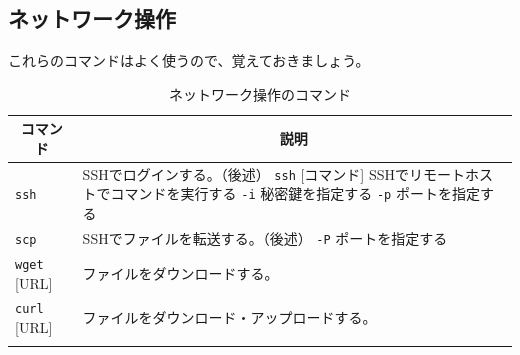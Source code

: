 \documentclass[a4j]{ltjsreport}
\begin{document}
    \subsection{ネットワーク操作}
    これらのコマンドはよく使うので、覚えておきましょう。
    \begin{longtable}[c]{|p{3.5cm}|p{13.5cm}|}
        \hline
        \multicolumn{1}{|c|}{\textbf{コマンド}}&\multicolumn{1}{|c|}{\textbf{説明}}\\
        \hline\hline
        \texttt{ssh} &SSHでログインする。（後述） \texttt{ssh} [コマンド] SSHでリモートホストでコマンドを実行する \texttt{-i} 秘密鍵を指定する \texttt{-p} ポートを指定する\\
        \hline
        \texttt{scp} &SSHでファイルを転送する。（後述） \texttt{-P} ポートを指定する\\
        \hline
        \texttt{wget} [URL] &ファイルをダウンロードする。\\
        \hline
        \texttt{curl} [URL] &ファイルをダウンロード・アップロードする。\\
        \hline
        \caption{ネットワーク操作のコマンド}
    \end{longtable}
\end{document}
